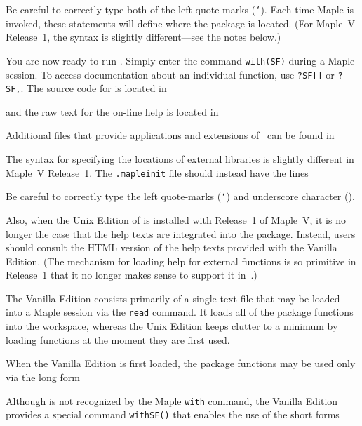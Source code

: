 \noindent
Be careful to correctly type both of the left quote-marks ({\tt `}).
Each time Maple is invoked, these statements will define where the
package is located. (For Maple~V Release~1, the syntax is slightly
different---see the notes below.)

You are now ready to run \SF. Simply enter the command {\tt with(SF)}
during a Maple session. To access documentation about an individual
function, use {\tt ?SF[]} or
{\tt ?SF,}. The source code for \SF{} is located in


\noindent and the raw text for the on-line help is located in


\noindent Additional files that provide applications and extensions of~\SF{}
can be found in


The syntax for specifying the locations of external libraries is
slightly different in Maple~V Release~1. The {\tt .mapleinit} file
should instead have the lines
\medskip
{}
\medskip

\noindent Be careful to correctly type the left quote-marks ({\tt `})
and underscore character ({\tt \ul{}}).

Also, when the Unix Edition of \SF{} is installed with Release~1 of
Maple~V, it is no longer the case that the help texts are integrated
into the package. Instead, users should consult the HTML version of
the help texts provided with the Vanilla Edition. (The mechanism for
loading help for external functions is so primitive in Release~1 that
it no longer makes sense to support it in~\SF.)

The Vanilla Edition consists primarily of a single text file that may
be loaded into a Maple session via the {\tt read} command. It loads all
of the package functions into the workspace, whereas the Unix Edition
keeps clutter to a minimum by loading functions at the moment they are
first used.

When the Vanilla Edition is first loaded, the package functions
may be used only via the long form


\noindent Although \SF{} is not recognized by the Maple {\tt with}
command, the Vanilla Edition provides a special command {\tt withSF()}
that enables the use of the short forms


